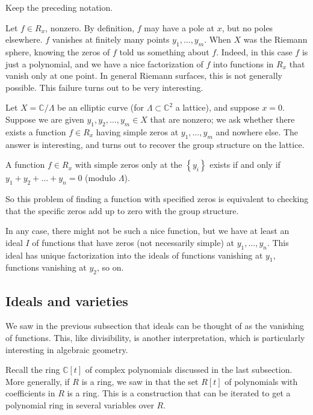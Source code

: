 \begin{example} Keep the preceding notation.

Let $f \in R_x$, nonzero. By definition, $f$ may have a pole at $x$, but no poles elsewhere. $f$ vanishes
at finitely many points $y_1, \dots, y_m$. When $X$ was the Riemann sphere,
knowing the zeros of $f$ told us something about $f$. Indeed, in this case
$f$ is just a
polynomial, and we have a nice factorization of $f$ into functions in $R_x$ that vanish only
at one point. In general Riemann surfaces, this
is not generally possible.  This failure turns out to be very interesting.

Let $X = \mathbb{C}/\Lambda$ be an elliptic curve (for $\Lambda \subset
\mathbb{C}^2$ a lattice), and suppose $x = 0$. Suppose we
are given $y_1, y_2, \dots, y_m \in X$ that are nonzero; we ask whether there
exists a function $f \in R_x$ having simple zeros at $y_1, \dots, y_m$ and nowhere else.
The answer is interesting, and turns out to recover the group structure on the
lattice.

\begin{proposition} 
A function $f \in R_x$ with simple zeros only at the $\left\{y_i\right\}$ exists if and only if $y_1 + y_2 + \dots + y_n = 0$ (modulo $\Lambda$).

\end{proposition} 
So this problem of finding a function with specified zeros is equivalent to
checking that the specific zeros add up to zero with the group structure.

In any case, there might not be such a nice function, but we have at least an
ideal $I$ of functions that have zeros (not necessarily simple) at $y_1, \dots,
y_n$.  This ideal has unique factorization into the ideals of functions
vanishing at $y_1$, functions vanishing at $y_2$, so on.  
\end{example} 


\subsection{Ideals and varieties}

We saw in the previous subsection that ideals can be thought of as the
vanishing of functions. This, like divisibility, is another interpretation,
which is particularly interesting in algebraic geometry.


Recall the  ring $\mathbb{C}[t]$ of complex polynomials discussed in the
last subsection. More generally, if $R$ is a ring,  we saw in
 that the set $R[t]$ of polynomials with coefficients
in $R$
is a ring.  This is a construction that
can be iterated to get a polynomial ring in several variables over $R$.


